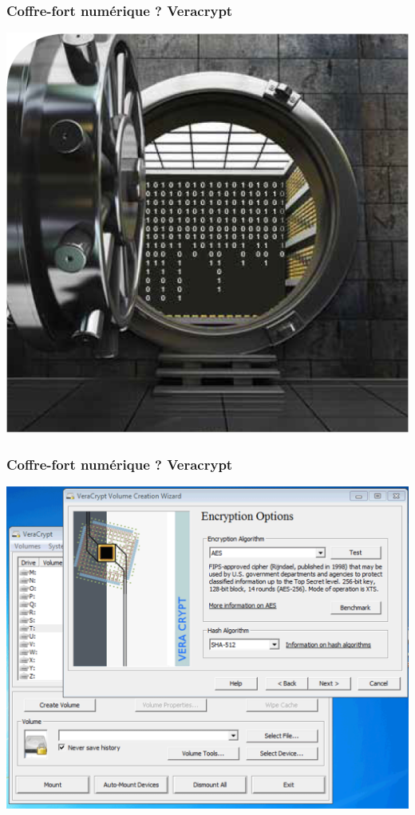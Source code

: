 \documentclass{beamer}
\begin{document}
\begin{frame}
\frametitle{Coffre-fort numérique ? Veracrypt}
\begin{center}
\includegraphics[scale=0.5]{./images/coffre_fort_numerique.png}
\end{center}
\end{frame}

\begin{frame}
\frametitle{Coffre-fort numérique ? Veracrypt}
\begin{center}
\includegraphics[scale=0.3]{./images/vercrypt.png}
\end{center}
\end{frame}
\end{document}
